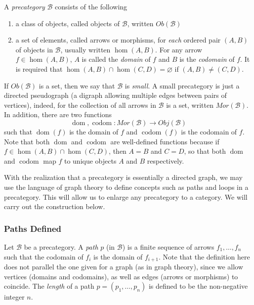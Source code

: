 \documentclass[12pt]{article}
\begin{document}
A \emph{precategory} $\mathcal{B}$ consists of the following 

\begin{enumerate}
\item a class of objects, called objects of $\mathcal{B}$, written $Ob(\mathcal{B})$
\item a set of elements, called arrows or morphisms, for \emph{each} ordered pair $(A,B)$ of objects in $\mathcal{B}$, usually written $\hom(A,B)$.  For any arrow $f\in\hom(A,B)$, $A$ is called the \emph{domain} of $f$ and $B$ is the \emph{codomain} of $f$.  It is required that $\hom(A,B)\cap\hom(C,D)=\varnothing$ if $(A,B)\neq(C,D)$.
\end{enumerate}

If $Ob(\mathcal{B})$ is a set, then we say that $\mathcal{B}$ is \emph{small}.  A small precategory is just a directed pseudograph (a digraph allowing multiple edges between pairs of vertices), indeed, for the collection of all arrows in $\mathcal{B}$ is a set, written $Mor(\mathcal{B})$.  In addition, there are two functions 
$$\operatorname{dom},\operatorname{codom}:Mor(\mathcal{B})\to Obj(\mathcal{B})$$
such that $\operatorname{dom}(f)$ is the domain of $f$ and $\operatorname{codom}(f)$ is the codomain of $f$.  Note that both $\operatorname{dom}$ and $\operatorname{codom}$ are well-defined functions because if $f\in \hom(A,B)\cap \hom(C,D)$, then $A=B$ and $C=D$, so that both $\operatorname{dom}$ and $\operatorname{codom}$ map $f$ to unique objects $A$ and $B$ respectively.

With the realization that a precategory is essentially a directed graph, we may use the language of graph theory to define concepts such as paths and loops in a precategory.  This will allow us to enlarge any precategory to a category.  We will carry out the construction below.

\subsubsection*{Paths Defined}
Let $\mathcal{B}$ be a precategory.  A \emph{path} $p$ (in $\mathcal{B}$) is a finite sequence of arrows $f_1,\ldots,f_n$ such that the codomain of $f_i$ is the domain of $f_{i+1}$.  Note that the definition here does not parallel the one given for a graph (as in graph theory), since we allow vertices (domains and codomains), as well as edges (arrows or morphisms) to coincide.  The \emph{length} of a path $p=(p_1,\ldots,p_n)$ is defined to be the non-negative integer $n$.
\end{document}
